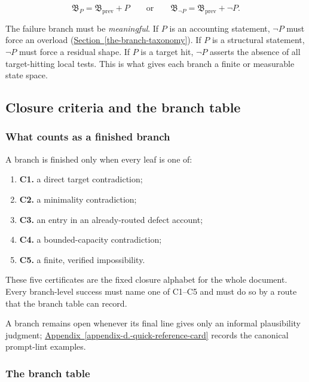 \documentclass[
  11pt,
]{article}
\providecommand{\tightlist}{%
  \setlength{\itemsep}{0pt}\setlength{\parskip}{0pt}}
\theoremstyle{definition}
\newcommand{\secref}[1]{\hyperref[#1]{Section~\ref*{#1}}}
\newcommand{\appref}[1]{\hyperref[#1]{Appendix~\ref*{#1}}}
\begin{document}
\[
\mathfrak B_P = \mathfrak B_{\mathrm{prev}} + P
\qquad\text{or}\qquad
\mathfrak B_{\neg P} = \mathfrak B_{\mathrm{prev}} + \neg P.
\]

The failure branch must be \emph{meaningful}. If \(P\) is an accounting
statement, \(\neg P\) must force an overload (\secref{the-branch-taxonomy}). If \(P\) is a
structural statement, \(\neg P\) must force a residual shape. If \(P\)
is a target hit, \(\neg P\) asserts the absence of all target-hitting
local tests. This is what gives each branch a finite or measurable state
space.

\subsection{Closure criteria and the branch
table}\label{closure-criteria-and-the-branch-table}

\subsubsection{What counts as a finished
branch}\label{what-counts-as-a-finished-branch}

A branch is finished only when every leaf is one of:

\begin{enumerate}
\def\labelenumi{\arabic{enumi}.}
\tightlist
\item \textbf{C1.} a direct target contradiction;
\item \textbf{C2.} a minimality contradiction;
\item \textbf{C3.} an entry in an already-routed defect account;
\item \textbf{C4.} a bounded-capacity contradiction;
\item \textbf{C5.} a finite, verified impossibility.
\end{enumerate}

These five certificates are the fixed closure alphabet for the whole
document. Every branch-level success must name one of C1--C5 and must do
so by a route that the branch table can record.

A branch remains open whenever its final line gives only an informal
plausibility judgment; \appref{appendix-d.-quick-reference-card} records
the canonical prompt-lint examples.

\subsubsection{The branch table}\label{the-branch-table}
\end{document}

